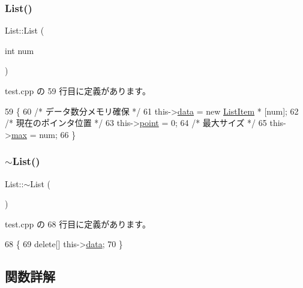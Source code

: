 \subsubsection{\texorpdfstring{List()}{List()}}
{\footnotesize\ttfamily List\+::\+List (\begin{DoxyParamCaption}\item[{int}]{num }\end{DoxyParamCaption})\hspace{0.3cm}{\ttfamily [inline]}}



 test.\+cpp の 59 行目に定義があります。


\begin{DoxyCode}
59                  \{
60         \textcolor{comment}{/* データ数分メモリ確保 */}
61         this->\hyperlink{class_list_a0fd821411e5922f1733b2afe207f6b28}{data} = \textcolor{keyword}{new} \hyperlink{class_list_item}{ListItem} * [num];
62         \textcolor{comment}{/* 現在のポインタ位置 */}
63         this->\hyperlink{class_list_ab03801c8c3765b381b45a306d34f5daa}{point} = 0;
64         \textcolor{comment}{/* 最大サイズ */}
65         this->\hyperlink{class_list_a73fc93ef327ff5f4bb35fd628b658d50}{max} = num;
66     \}
\end{DoxyCode}
\mbox{\label{class_list_a70aecf37bd9d779a394e4d50377fbf5f}} 
\subsubsection{\texorpdfstring{$\sim$\+List()}{~List()}}
{\footnotesize\ttfamily List\+::$\sim$\+List (\begin{DoxyParamCaption}{ }\end{DoxyParamCaption})\hspace{0.3cm}{\ttfamily [inline]}}



 test.\+cpp の 68 行目に定義があります。


\begin{DoxyCode}
68            \{
69         \textcolor{keyword}{delete}[] this->\hyperlink{class_list_a0fd821411e5922f1733b2afe207f6b28}{data};
70     \}
\end{DoxyCode}


\subsection{関数詳解}
\mbox{\label{class_list_a593e13086a1d135ac9efb530d26cd94b}} 
